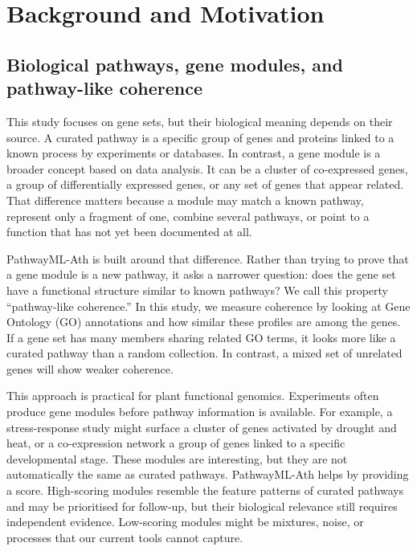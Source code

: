 \documentclass[12pt,twoside]{article}
\begin{document}
\section{Background and Motivation}
\label{sec:background_motivation}

\subsection{Biological pathways, gene modules, and pathway-like coherence}
\label{sec:bg_pathways_modules}

This study focuses on gene sets, but their biological meaning depends on their source. A curated pathway is a specific group of genes and proteins linked to a known process by experiments or databases. In contrast, a gene module is a broader concept based on data analysis. It can be a cluster of co-expressed genes, a group of differentially expressed genes, or any set of genes that appear related. That difference matters because a module may match a known pathway, represent only a fragment of one, combine several pathways, or point to a function that has not yet been documented at all.

PathwayML-Ath is built around that difference. Rather than trying to prove that a gene module is a new pathway, it asks a narrower question: does the gene set have a functional structure similar to known pathways? We call this property ``pathway-like coherence.'' In this study, we measure coherence by looking at Gene Ontology (GO) annotations and how similar these profiles are among the genes. If a gene set has many members sharing related GO terms, it looks more like a curated pathway than a random collection. In contrast, a mixed set of unrelated genes will show weaker coherence.

This approach is practical for plant functional genomics. Experiments often produce gene modules before pathway information is available. For example, a stress-response study might surface a cluster of genes activated by drought and heat, or a co-expression network a group of genes linked to a specific developmental stage. These modules are interesting, but they are not automatically the same as curated pathways. PathwayML-Ath helps by providing a score. High-scoring modules resemble the feature patterns of curated pathways and may be prioritised for follow-up, but their biological relevance still requires independent evidence. Low-scoring modules might be mixtures, noise, or processes that our current tools cannot capture.
\end{document}
